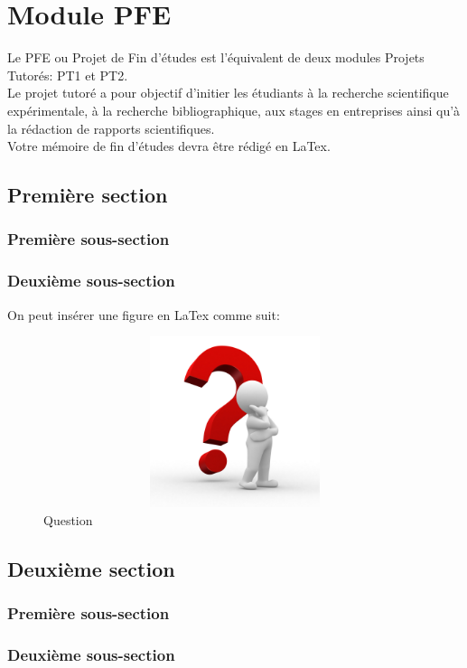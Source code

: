 \chapter{Module PFE}

Le PFE ou Projet de Fin d'études est l'équivalent de deux modules Projets Tutorés: PT1 et PT2.\\

Le projet tutoré a pour objectif d'initier les étudiants à la recherche scientifique expérimentale, à la recherche bibliographique, aux stages en entreprises ainsi qu'à la rédaction de rapports scientifiques. \\ 

Votre mémoire de fin d'études devra être rédigé en LaTex.\\


 
 
\section{Première section}  
\subsection{Première sous-section}

\subsection{Deuxième sous-section}
On peut insérer une figure en LaTex comme suit:
\begin{figure}
	\begin{center}
	\includegraphics[width=12cm,height=5cm]{fig1.png}
	\caption{Question}
	\end{center}
\end{figure}



\section{Deuxième section}

\subsection{Première sous-section}

\subsection{Deuxième sous-section}


 



 




